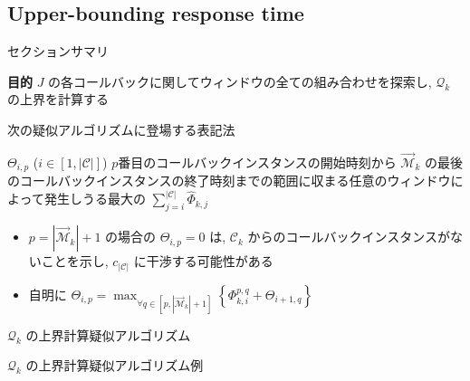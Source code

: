 \subsection{Upper-bounding response time}
\label{ssec: upper bounding response time}

\begin{frame}{セクションサマリ}
    \begin{itembox}[l]{\textbf{目的}}
        $J$ の各コールバックに関してウィンドウの全ての組み合わせを探索し, $\mathcal{Q}_{k}$ の上界を計算する
    \end{itembox}
\end{frame}

\begin{frame}{次の疑似アルゴリズムに登場する表記法}
    \begin{block}{$\Theta_{i, p}$ ($i \in[1,|\mathcal{C}|]$)}
        $ p $番目のコールバックインスタンスの開始時刻から $\overrightarrow{\mathcal{M}}_{k}$ の最後のコールバックインスタンスの終了時刻までの範囲に収まる任意のウィンドウによって発生しうる最大の $\sum_{j=i}^{|\mathcal{C}|} \hat{\Phi}_{k, j}$
    \end{block}
    \begin{itemize}
        \item $p=\left|\overrightarrow{\mathcal{M}}_{k}\right|+1$ の場合の $\Theta_{i, p}=0$ は, $\mathcal{C}_{k}$ からのコールバックインスタンスがないことを示し, $c_{|\mathcal{C}|}$ に干渉する可能性がある
        \item 自明に $\Theta_{i, p}=\max _{\forall q \in\left[p,\left|\overrightarrow{\mathcal{M}}_{k}\right|+1\right]}\left\{\Phi_{k, i}^{p, q}+\Theta_{i+1, q}\right\}$
    \end{itemize}
\end{frame}

\begin{frame}[label=alg2]{$\mathcal{Q}_k$ の上界計算疑似アルゴリズム}
\end{frame}

\begin{frame}{$\mathcal{Q}_k$ の上界計算疑似アルゴリズム例}
\end{frame}

